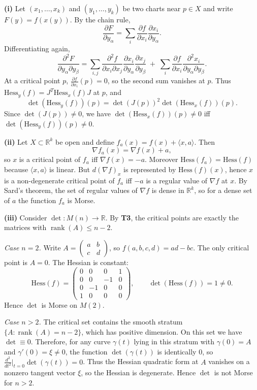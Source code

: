 \begin{solution}
\noindent\textbf{(i)}
	Let $(x_1,\dots,x_k)$ and $(y_1,\dots,y_k)$ be two charts near $p\in X$ and write $F(y)=f(x(y))$.
	By the chain rule,
	\[
	\frac{\partial F}{\partial y_\alpha}
	=\sum_i \frac{\partial f}{\partial x_i}\frac{\partial x_i}{\partial y_\alpha}.
	\]
	Differentiating again,
	\[
	\frac{\partial^2 F}{\partial y_\alpha\partial y_\beta}
	=\sum_{i,j}\frac{\partial^2 f}{\partial x_i\partial x_j}
	\frac{\partial x_i}{\partial y_\alpha}\frac{\partial x_j}{\partial y_\beta}
	\;+\;\sum_i \frac{\partial f}{\partial x_i}\frac{\partial^2 x_i}{\partial y_\alpha\partial y_\beta}.
	\]
	At a critical point $p$, $\frac{\partial f}{\partial x_i}(p)=0$, so the second sum vanishes at $p$.
	Thus $\mathrm{Hess}_y(f)=J^T\mathrm{Hess}_x(f)J$ at $p$, and
	\[
	\det(\mathrm{Hess}_y(f))(p)=\det(J(p))^2\det(\mathrm{Hess}_x(f))(p).
	\]
	Since $\det(J(p))\neq 0$, we have $\det(\mathrm{Hess}_x(f))(p)\neq 0$ iff $\det(\mathrm{Hess}_y(f))(p)\neq 0$.

	\medskip
	\noindent\textbf{(ii)}
	Let $X\subset\mathbb{R}^k$ be open and define $f_a(x)=f(x)+\langle x,a\rangle$.
	Then
	\[
	\nabla f_a(x)=\nabla f(x)+a,
	\]
	so $x$ is a critical point of $f_a$ iff $\nabla f(x)=-a$.
	Moreover $\mathrm{Hess}(f_a)=\mathrm{Hess}(f)$ because $\langle x,a\rangle$ is linear.
	But $d(\nabla f)_x$ is represented by $\mathrm{Hess}(f)(x)$, hence $x$ is a non-degenerate critical point of $f_a$
	iff $-a$ is a regular value of $\nabla f$ at $x$.
	By Sard's theorem, the set of regular values of $\nabla f$ is dense in $\mathbb{R}^k$,
	so for a dense set of $a$ the function $f_a$ is Morse.

	\medskip
	\noindent\textbf{(iii)}
	Consider $\det:M(n)\to\mathbb{R}$. By \textbf{T3}, the critical points are exactly the matrices with
	$\operatorname{rank}(A)\le n-2$.

	\smallskip
	\noindent\emph{Case $n=2$.}
	Write $A=\begin{pmatrix}a&b\\c&d\end{pmatrix}$, so $f(a,b,c,d)=ad-bc$.
	The only critical point is $A=0$. The Hessian is constant:
	\[
	\mathrm{Hess}(f)=
	\begin{pmatrix}
		0&0&0&1\\
		0&0&-1&0\\
		0&-1&0&0\\
		1&0&0&0
	\end{pmatrix},
	\qquad
	\det(\mathrm{Hess}(f))=1\neq 0.
	\]
	Hence $\det$ is Morse on $M(2)$.

	\smallskip
	\noindent\emph{Case $n>2$.}
	The critical set contains the smooth stratum $\{A:\operatorname{rank}(A)=n-2\}$, which has positive dimension.
	On this set we have $\det\equiv 0$. Therefore, for any curve $\gamma(t)$ lying in this stratum with
	$\gamma(0)=A$ and $\gamma'(0)=\xi\neq 0$, the function $\det(\gamma(t))$ is identically $0$, so
	$\frac{d^2}{dt^2}\big|_{t=0}\det(\gamma(t))=0$.
	Thus the Hessian quadratic form at $A$ vanishes on a nonzero tangent vector $\xi$, so the Hessian is degenerate.
	Hence $\det$ is not Morse for $n>2$.

	\medskip
\end{solution}

